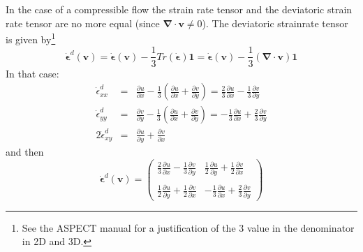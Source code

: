 In the case of a compressible flow the strain rate tensor and the deviatoric strain rate tensor are no more equal (since ${\bm \nabla}\cdot{\bm v} \neq 0$).
The deviatoric strainrate tensor is given by\footnote{See the ASPECT manual for a justification of the 3 value in the denominator in 2D and 3D.} 
\[
\dot{\bm \epsilon}^d({\bm v})=
\dot{\bm \epsilon}({\bm v})-\frac{1}{3} Tr(\dot{\bm \epsilon}) {\bm 1}
=\dot{\bm \epsilon}({\bm v})-\frac{1}{3} ({\bm \nabla}\cdot{\bm v}) {\bm 1}
\]
In that case:
\begin{eqnarray}
\dot{\epsilon}_{xx}^d 
&=& \frac{\partial u}{\partial x}
-\frac{1}{3} \left( \frac{\partial u}{\partial x} + \frac{\partial v}{\partial y} \right) 
= \frac{2}{3}\frac{\partial u}{\partial x}
-\frac{1}{3} \frac{\partial v}{\partial y}
\\
\dot{\epsilon}_{yy}^d 
&=& \frac{\partial v}{\partial y}
-\frac{1}{3} \left( \frac{\partial u}{\partial x} + \frac{\partial v}{\partial y} \right) 
=-\frac{1}{3} \frac{\partial u}{\partial x} 
+ \frac{2}{3} \frac{\partial v}{\partial y} 
\\
2\dot{\epsilon}_{xy}^d 
&=& 
\frac{\partial u}{\partial y} 
+\frac{\partial v}{\partial x} 
\end{eqnarray}
and then 
\[
\dot{\bm \epsilon}^d({\bm v})
=
\left(
\begin{array}{cc}
\frac{2}{3} \frac{\partial u}{\partial x} -\frac{1}{3} \frac{\partial v}{\partial y} &
\frac{1}{2}\frac{\partial u}{\partial y} + \frac{1}{2}\frac{\partial v}{\partial x}  \\ \\
\frac{1}{2}\frac{\partial u}{\partial y} + \frac{1}{2}\frac{\partial v}{\partial x}  &
-\frac{1}{3} \frac{\partial u}{\partial x} +\frac{2}{3} \frac{\partial v}{\partial y} 
\end{array}
\right)
\]

